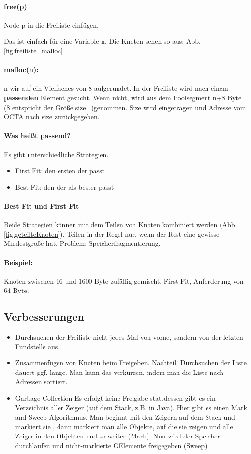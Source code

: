 \paragraph{free(p)} Node p in die Freiliste einfügen.

Das ist einfach für eine Variable n. Die Knoten sehen so aus: Abb. \ref{fig:freiliste_malloc}
\paragraph{malloc(n):} n wir auf ein Vielfaches von 8 aufgerundet. In der Freiliste wird nach einem \textbf{passenden} Element gesucht. Wenn nicht, wird aus dem Poolsegment n+8 Byte (8 entspricht der Größe size=)genommen. Size wird eingetragen und Adresse vom OCTA nach size zurückgegeben. 
\paragraph{Was heißt passend?} Es gibt unterschiedliche Strategien. 
\begin{itemize}
\item First Fit: den ersten der passt
\item Best Fit: den der als bester passt
\end{itemize}

\paragraph{Best Fit und First Fit} 
Beide Strategien können mit dem Teilen von Knoten kombiniert werden (Abb. \ref{fig:geteilteKnoten}). Teilen in der Regel nur, wenn der Rest eine gewisse Mindestgröße hat. Problem: Speicherfragmentierung. 
\paragraph{Beispiel:} Knoten zwischen 16 und 1600 Byte zufällig gemischt, First Fit, Anforderung von 64 Byte.

\subsection{Verbesserungen}
\begin{itemize}
\item Durchsuchen der Freiliste nicht jedes Mal von vorne, sondern von der letzten Fundstelle aus. 
\item Zusammenfügen von Knoten beim Freigeben. Nachteil: Durchsuchen der Liste dauert ggf. lange. Man kann das verkürzen, indem man die Liste nach Adressen sortiert. 
\item Garbage Collection
	\subitem Es erfolgt keine Freigabe
	\subitem stattdessen gibt es ein Verzeichnis aller Zeiger (auf dem Stack, z.B. in Java).
	\subitem Hier gibt es einen Mark and Sweep Algorithmus. Man beginnt mit den Zeigern auf dem Stack und markiert sie , dann markiert man alle Objekte, auf die sie zeigen und alle Zeiger in den Objekten und so weiter (Mark). Nun wird der Speicher durchlaufen und nicht-markierte OElemente freigegeben (Sweep). 
\end{itemize}
